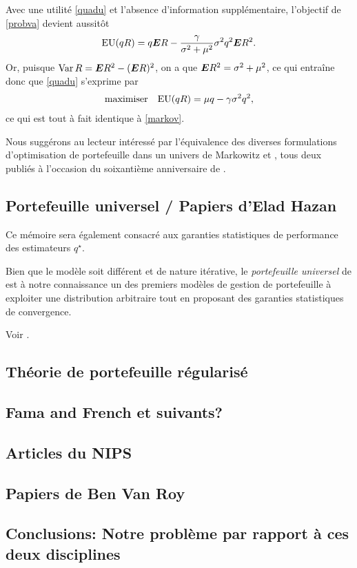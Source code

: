 Avec une utilité \eqref{quadu} et l'absence d'information supplémentaire, l'objectif de
\eqref{probva} devient aussitôt
\begin{equation}
  \label{euquad}
  \operatorname{\bm{EU}}(qR) = q \bm E R - \frac{\gamma}{\sigma^2+\mu^2}\sigma^2 q^2\bm E R^2.
\end{equation}
Or, puisque $\operatorname{\bm{Var}} R = \bm E  R^2 - (\bm E R)^2$, on a que $\bm E R^2 = \sigma^2 + \mu^2$, ce qui entraîne
donc que \eqref{quadu} s'exprime par
\begin{equation}
  \begin{array}{ll}\operatorname*{maximiser} & \displaystyle{\operatorname{\bm{EU}}(qR) = \mu q - \gamma\sigma^2 q^2,}\end{array}
\end{equation}
ce qui est tout à fait identique à \eqref{markov}.

Nous suggérons au lecteur intéressé par l'équivalence des diverses formulations
d'optimi\-sation de portefeuille dans un univers de Markowitz \cite{bodnar2013equivalence}
et \cite{markowitz2014mean}, tous deux publiés à l'occasion du soixantième anniversaire de
\cite{markowitz1952portfolio}.

\subsection{Portefeuille universel / Papiers d'Elad Hazan}

Ce mémoire sera également consacré aux garanties statistiques de performance des
estimateurs $q^\star$.

Bien que le modèle soit différent et de nature itérative, le \textit{portefeuille
  universel} de \cite{cover1991universal} est à notre connaissance un des premiers modèles
de gestion de portefeuille à exploiter une distribution arbitraire tout en proposant des
garanties statistiques de convergence.

Voir \cite{cover1991universal,hazan2015online}.


\subsection{Théorie de portefeuille régularisé}

\cite{ban2016machine}

\subsection{Fama and French et suivants?}

\cite{fama1993common}


\subsection{Articles du NIPS}

\subsection{Papiers de Ben Van Roy}

\subsection{Conclusions: Notre problème par rapport à ces deux disciplines}




